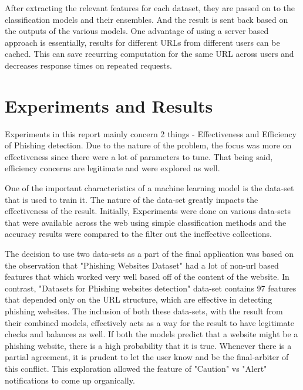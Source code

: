 \documentclass[conference]{IEEEtran}
\begin{document}
\par After extracting the relevant features for each dataset, they are passed on to the classification models and their ensembles.
And the result is sent back based on the outputs of the various models. 
One advantage of using a server based approach is essentially, results for different URLs from different users can be cached. This can save recurring computation for the same URL across users and decreases response times on repeated requests.


\section{Experiments and Results}

Experiments in this report mainly concern 2 things - Effectiveness and Efficiency of Phishing detection. Due to the nature of the problem, the focus was more on effectiveness since there were a lot of parameters to tune. That being said, efficiency concerns are legitimate and were explored as well.

\par One of the important characteristics of a machine learning model is the data-set that is used to train it. The nature of the data-set greatly impacts the effectiveness of the result. Initially, Experiments were done on various data-sets that were available across the web using simple classification methods and the accuracy results were compared to the filter out the ineffective collections.

\par The decision to use two data-sets as a part of the final application was based on the observation that "Phishing Websites Dataset"\cite{UCIDataset} had a lot of non-url based features that which worked very well based off of the content of the website. In contrast, "Datasets for Phishing websites detection"\cite{GregaDataset} data-set contains 97 features that depended only on the URL structure, which are effective in detecting phishing websites. The inclusion of both these data-sets, with the result from their combined models, effectively acts as a way for the result to have legitimate checks and balances as well. If both the models predict that a website might be a phishing website, there is a high probability that it is true. Whenever there is a partial agreement, it is prudent to let the user know and be the final-arbiter of this conflict. This exploration allowed the feature of "Caution" vs "Alert" notifications to come up organically.
\end{document}
